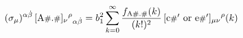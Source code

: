 \begin{equation}
(\sigma_{\mu})^{\alpha\dot\beta}\,
[\mbox{A{\footnotesize\#}.{\footnotesize\#}}]_\nu{}^\rho{}_{\alpha\dot\beta}  =
b_1^2 \sum_{k=0}^\infty \frac{f_{\mathrm{A\#.\#}}(k)}{(k!)^2}  \,
[\mbox{c{\footnotesize\#}$'$ or e{\footnotesize\#}$'$}]_{\mu\nu}{}^\rho(k) 
\label{eq:Ace}
\end{equation}

